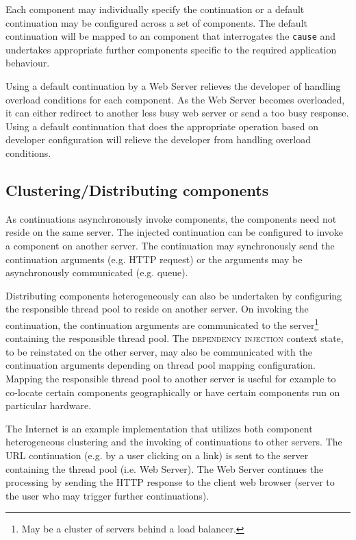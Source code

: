\documentclass[prodmode]{style/acmlarge}
\begin{document}
Each component may individually specify the continuation or a default
continuation may be configured across a set of components.
The default continuation will be mapped to an component that interrogates the
\texttt{cause} and undertakes appropriate further components specific to the
required application behaviour.

Using a default continuation by a Web Server relieves the developer of handling
overload conditions for each component.  As the Web Server becomes overloaded,
it can either redirect to another less busy web server or send a too busy
response.  Using a default continuation that does the appropriate operation
based on developer configuration will relieve the developer from handling
overload conditions.


\subsection{Clustering/Distributing components}

As continuations asynchronously invoke components, the components need not
reside on the same server.  The injected continuation can be configured to
invoke a component on another server.  The continuation may synchronously send
the continuation arguments (e.g. HTTP request) or the arguments may be
asynchronously communicated (e.g. queue).

Distributing components heterogeneously can also be undertaken by configuring
the responsible thread pool to reside on another server.  On invoking the
continuation, the continuation arguments are communicated to the
server\footnote{May be a cluster of servers behind a load balancer.} containing
the responsible thread pool.  The \textsc{dependency injection} context state,
to be reinstated on the other server, may also be communicated with the
continuation arguments depending on thread pool mapping configuration.  Mapping
the responsible thread pool to another server is useful for example to co-locate
certain components geographically or have certain components run on particular
hardware.

The Internet is an example implementation that utilizes both component
heterogeneous clustering and the invoking of continuations to other servers. 
The URL continuation (e.g. by a user clicking on a link) is sent to the server
containing the thread pool (i.e. Web Server).  The Web Server continues the
processing by sending the HTTP response to the client web browser (server to the
user who may trigger further continuations).
\end{document}
